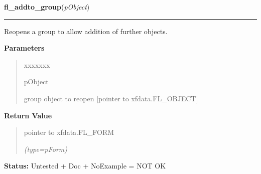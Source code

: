     \vspace{0.5ex}

\hspace{.8\funcindent}\begin{boxedminipage}{\funcwidth}

    \raggedright \textbf{fl\_addto\_group}(\textit{pObject})

    \vspace{-1.5ex}

    \rule{\textwidth}{0.5\fboxrule}
\setlength{\parskip}{2ex}
    Reopens a group to allow addition of further objects.

\setlength{\parskip}{1ex}
      \textbf{Parameters}
      \vspace{-1ex}

      \begin{quote}
        \begin{Ventry}{xxxxxxx}

          \item[pObject]

          group object to reopen [pointer to xfdata.FL\_OBJECT]

        \end{Ventry}

      \end{quote}

      \textbf{Return Value}
    \vspace{-1ex}

      \begin{quote}
      pointer to xfdata.FL\_FORM

      {\it (type=pForm)}

      \end{quote}

\textbf{Status:} Untested + Doc + NoExample = NOT OK



    \end{boxedminipage}

    \label{xformslib:library:fl_get_object_objclass}

    \vspace{0.5ex}

